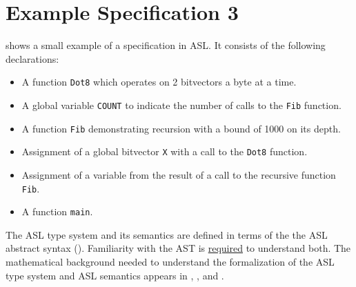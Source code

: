 \begin{center}

\end{center}

\section{Example Specification 3}
 shows a small example of a specification in ASL. It consists of the following declarations:
\begin{itemize}
    \item A function \texttt{Dot8} which operates on 2 bitvectors a byte at a time.
    \item A global variable \texttt{COUNT} to indicate the number of calls to the \texttt{Fib} function.
    \item A function \texttt{Fib} demonstrating recursion with a bound of 1000 on its depth.
    \item Assignment of a global bitvector \texttt{X} with a call to the \texttt{Dot8} function.
    \item Assignment of a variable from the result of a call to the recursive function \texttt{Fib}.
    \item A function \texttt{main}.
\end{itemize}

\begin{center}

\end{center}

The ASL type system and its semantics are defined in terms of
the the ASL abstract syntax ().
Familiarity with the AST is \underline{required} to understand both.
The mathematical background needed to understand the formalization
of the ASL type system and ASL semantics appears in ,
, and .

